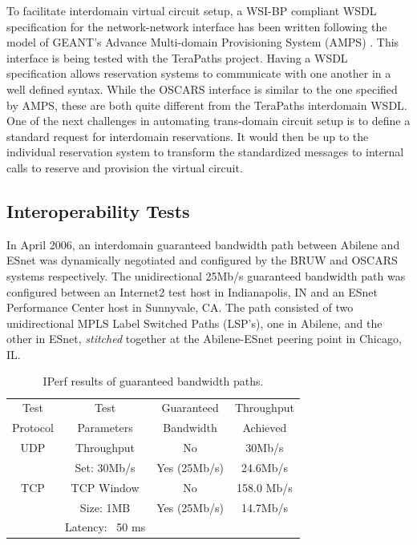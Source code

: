 \documentclass[conference]{IEEEtran}
\begin{document}
To facilitate interdomain virtual circuit setup, a WSI-BP \cite{ballinger}
compliant WSDL specification for the 
network-network interface has been written following the model of 
GEANT's Advance Multi-domain Provisioning
System (AMPS)  \cite{GEANT-AMPS} . This interface is being tested with the 
TeraPaths \cite{TeraPaths} project. 
Having a WSDL specification allows reservation systems to communicate with one 
another in a well defined 
syntax. While the OSCARS interface is similar to the one specified by AMPS, these
are both quite different from the TeraPaths interdomain WSDL.
One of the next challenges in
automating trans-domain circuit setup is to define a standard request for interdomain
reservations. It would then be up to the individual reservation system to 
transform the standardized messages to internal calls to reserve and provision the 
virtual circuit.

 \subsection{Interoperability Tests}

In April 2006, an interdomain guaranteed bandwidth path between Abilene and 
ESnet was dynamically negotiated and configured by the BRUW and OSCARS systems 
respectively. The unidirectional 25Mb/s guaranteed bandwidth path was 
configured between an Internet2 test host in Indianapolis, IN and an ESnet 
Performance Center \cite{esnet-pc} host in Sunnyvale, CA.  The path consisted of two 
unidirectional MPLS Label Switched Paths (LSP's), one in Abilene, and the 
other in ESnet, \emph{stitched} together at the Abilene-ESnet peering point in 
Chicago, IL.

\begin{table}
 \centering
 {\scriptsize
 \begin{tabular}{|c|c|c|c|}
 \hline
 Test     & Test       & Guaranteed & Throughput  \\ 
 Protocol & Parameters & Bandwidth  & Achieved    \\ \hline \hline 
 UDP      & Throughput  & No         &   30Mb/s   \\ \cline{3-4}
          & Set: 30Mb/s& Yes (25Mb/s)&   24.6Mb/s \\ \hline
 TCP      & TCP Window & No         & 158.0 Mb/s  \\ \cline{3-4}
          & Size: 1MB  & Yes (25Mb/s)&  14.7Mb/s  \\ 
          & Latency: ~50 ms &          &            \\  \hline
 \end{tabular}
 }
 \caption{IPerf results of guaranteed bandwidth paths.}
 \label{tab:bandwidth}
\end{table}
\end{document}
